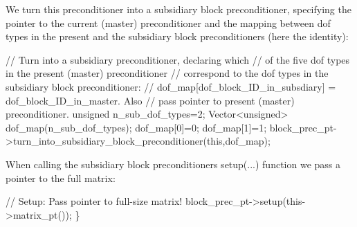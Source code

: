We turn this preconditioner into a subsidiary block preconditioner, specifying the pointer to the current (master) preconditioner and the mapping between dof types in the present and the subsidiary block preconditioners (here the identity)\+: 
\begin{DoxyCodeInclude}
   
   \textcolor{comment}{// Turn into a subsidiary preconditioner, declaring which}
   \textcolor{comment}{// of the five dof types in the present (master) preconditioner}
   \textcolor{comment}{// correspond to the dof types in the subsidiary block preconditioner:}
   \textcolor{comment}{// dof\_map[dof\_block\_ID\_in\_subsdiary] = dof\_block\_ID\_in\_master. Also }
   \textcolor{comment}{// pass pointer to present (master) preconditioner.}
   \textcolor{keywordtype}{unsigned} n\_sub\_dof\_types=2;
   Vector<unsigned> dof\_map(n\_sub\_dof\_types);
   dof\_map[0]=0;
   dof\_map[1]=1;
   block\_prec\_pt->turn\_into\_subsidiary\_block\_preconditioner(\textcolor{keyword}{this},dof\_map);

\end{DoxyCodeInclude}


When calling the subsidiary block preconditioners {\ttfamily setup}(...) function we pass a pointer to the full matrix\+: 
\begin{DoxyCodeInclude}
    
   \textcolor{comment}{// Setup: Pass pointer to full-size matrix!}
   block\_prec\_pt->setup(this->matrix\_pt());
  \}

\end{DoxyCodeInclude}


